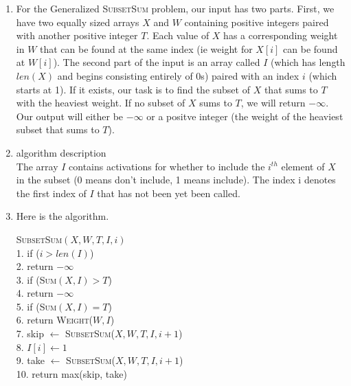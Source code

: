 \documentclass{article}
\begin{document}
\begin{enumerate}
    \item For the Generalized \textsc{SubsetSum} problem, our input has two parts.
    First, we have two equally sized arrays $X$ and $W$ containing positive integers paired with another positive integer $T$.
    Each value of $X$ has a corresponding weight in $W$ that can be found at the same index (ie weight for $X[i]$ can be found at $W[i]$).
    The second part of the input is an array called $I$ (which has length $len(X)$ and begins consisting entirely of 0s) paired with an index $i$ (which starts at 1).
    If it exists, our task is to find the subset of $X$ that sums to $T$ with the heaviest weight.
    If no subset of $X$ sums to $T$, we will return $-\infty$.
    Our output will either be $-\infty$ or a positve integer (the weight of the heaviest subset that sums to $T$).
    \item algorithm description \\
    The array $I$ contains activations for whether to include the $i^{th}$ element of $X$ in the subset (0 means don't include, 1 means include).
    The index i denotes the first index of $I$ that has not been yet been called.
    \item Here is the algorithm.
    \begin{algorithm}
        \textsc{SubsetSum}$(X, W, T, I, i)$ \\
        1.  \hspace{0em} if ($i > len(I)$) \\
        2.  \hspace{2em}     return $-\infty$ \\
        3.  \hspace{0em} if (\textsc{Sum}$(X, I) > T$) \\
        4.  \hspace{2em}     return $-\infty$ \\
        5.  \hspace{0em} if (\textsc{Sum}$(X, I) = T$) \\
        6.  \hspace{2em}     return \textsc{Weight}($W, I$) \\
        7.  \hspace{0em} skip $\leftarrow$ \textsc{SubsetSum}($X, W, T, I, i+1$) \\
        8.  \hspace{0em} $I[i] \leftarrow 1$ \\
        9.  \hspace{0em} take $\leftarrow$ \textsc{SubsetSum}($X, W, T, I, i+1$) \\
        10. return max(skip, take) \\


\end{algorithm}
\end{enumerate}
\end{document}
